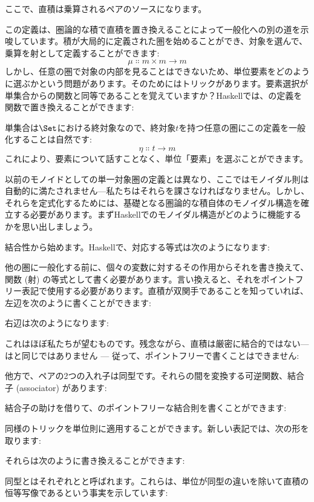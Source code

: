 ここで、直積は乗算されるペアのソースになります。

この定義は、圏論的な積で直積を置き換えることによって一般化への別の道を示唆しています。積が大局的に定義された圏を始めることができ、対象を選んで、乗算を射として定義することができます: 
\[\mu \Colon m\times{}m \to m\]
しかし、任意の圏で対象の内部を見ることはできないため、単位要素をどのように選ぶかという問題があります。そのためにはトリックがあります。要素選択が単集合からの関数と同等であることを覚えていますか？Haskellでは、の定義を関数で置き換えることができます: 

単集合は$\Set$における終対象なので、終対象$t$を持つ任意の圏にこの定義を一般化することは自然です: 
\[\eta \Colon t \to m\]
これにより、要素について話すことなく、単位「要素」を選ぶことができます。

以前のモノイドとしての単一対象圏の定義とは異なり、ここではモノイダル則は自動的に満たされません---私たちはそれらを課さなければなりません。しかし、それらを定式化するためには、基礎となる圏論的な積自体のモノイダル構造を確立する必要があります。まずHaskellでのモノイダル構造がどのように機能するかを思い出しましょう。

結合性から始めます。Haskellで、対応する等式は次のようになります: 

他の圏に一般化する前に、個々の変数に対するその作用からそれを書き換えて、関数 (射) の等式として書く必要があります。言い換えると、それをポイントフリー表記で使用する必要があります。直積が双関手であることを知っていれば、左辺を次のように書くことができます: 

右辺は次のようになります: 

これはほぼ私たちが望むものです。残念ながら、直積は厳密に結合的ではない--- はと同じではありません --- 従って、ポイントフリーで書くことはできません: 

他方で、ペアの2つの入れ子は同型です。それらの間を変換する可逆関数、結合子 (associator) があります: 

結合子の助けを借りて、のポイントフリーな結合則を書くことができます: 

同様のトリックを単位則に適用することができます。新しい表記では、次の形を取ります: 

それらは次のように書き換えることができます: 

同型とはそれぞれとと呼ばれます。これらは、単位\code{()}が同型の違いを除いて直積の恒等写像であるという事実を示しています: 

